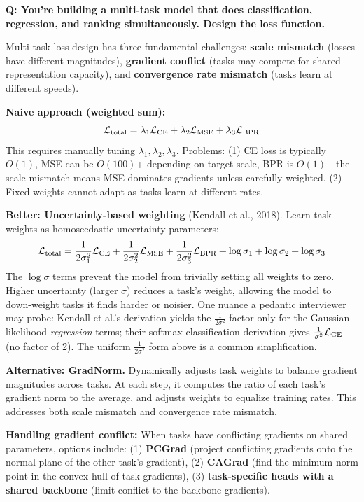 \begin{interviewq}
\textbf{Q: You're building a multi-task model that does classification, regression, and ranking simultaneously. Design the loss function.}

 \quad {} \quad \badgefreq{\freqmed}

\stronganswer Multi-task loss design has three fundamental challenges: \textbf{scale mismatch} (losses have different magnitudes), \textbf{gradient conflict} (tasks may compete for shared representation capacity), and \textbf{convergence rate mismatch} (tasks learn at different speeds).

\textbf{Naive approach (weighted sum):}
$$\mathcal{L}_{\text{total}} = \lambda_1 \mathcal{L}_{\text{CE}} + \lambda_2 \mathcal{L}_{\text{MSE}} + \lambda_3 \mathcal{L}_{\text{BPR}}$$
This requires manually tuning $\lambda_1, \lambda_2, \lambda_3$. Problems: (1) CE loss is typically $O(1)$, MSE can be $O(100)$+ depending on target scale, BPR is $O(1)$---the scale mismatch means MSE dominates gradients unless carefully weighted. (2) Fixed weights cannot adapt as tasks learn at different rates.

\textbf{Better: Uncertainty-based weighting} (Kendall et al., 2018). Learn task weights as homoscedastic uncertainty parameters:
$$\mathcal{L}_{\text{total}} = \frac{1}{2\sigma_1^2}\mathcal{L}_{\text{CE}} + \frac{1}{2\sigma_2^2}\mathcal{L}_{\text{MSE}} + \frac{1}{2\sigma_3^2}\mathcal{L}_{\text{BPR}} + \log\sigma_1 + \log\sigma_2 + \log\sigma_3$$
The $\log\sigma$ terms prevent the model from trivially setting all weights to zero. Higher uncertainty (larger $\sigma$) reduces a task's weight, allowing the model to down-weight tasks it finds harder or noisier. One nuance a pedantic interviewer may probe: Kendall et al.'s derivation yields the $\frac{1}{2\sigma^2}$ factor only for the Gaussian-likelihood \textit{regression} terms; their softmax-classification derivation gives $\frac{1}{\sigma^2}\mathcal{L}_{\text{CE}}$ (no factor of 2). The uniform $\frac{1}{2\sigma^2}$ form above is a common simplification.

\textbf{Alternative: GradNorm.} Dynamically adjusts task weights to balance gradient magnitudes across tasks. At each step, it computes the ratio of each task's gradient norm to the average, and adjusts weights to equalize training rates. This addresses both scale mismatch and convergence rate mismatch.

\textbf{Handling gradient conflict:} When tasks have conflicting gradients on shared parameters, options include: (1) \textbf{PCGrad} (project conflicting gradients onto the normal plane of the other task's gradient), (2) \textbf{CAGrad} (find the minimum-norm point in the convex hull of task gradients), (3) \textbf{task-specific heads with a shared backbone} (limit conflict to the backbone gradients).


\end{interviewq}
